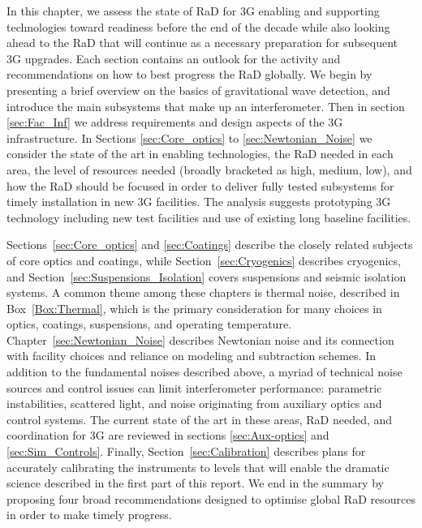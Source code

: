 
In this chapter, we assess the state of \ac{RaD} for \ac{3G} enabling and supporting technologies  toward readiness before the end of the decade while also looking ahead to the \ac{RaD} that will continue as a necessary preparation for subsequent \ac{3G} upgrades. Each section contains an outlook for the activity and recommendations on how to best  progress the \ac{RaD} globally.  We begin by presenting a brief overview on the basics of gravitational wave detection, and introduce the main subsystems that make up an interferometer. Then in section \ref{sec:Fac_Inf} we address requirements and design aspects of the \ac{3G} infrastructure. In Sections \ref{sec:Core_optics} to \ref{sec:Newtonian_Noise} we consider the state of the art in enabling technologies, the \ac{RaD} needed in each area, the level of resources needed (broadly bracketed as high, medium, low), and how the \ac{RaD} should be focused in order to deliver fully tested subsystems for timely installation in new \ac{3G} facilities.  The analysis suggests prototyping \ac{3G} technology including new test facilities and use of existing long baseline facilities. 



Sections~\ref{sec:Core_optics} and \ref{sec:Coatings} describe the closely related subjects of core optics and coatings, while Section~\ref{sec:Cryogenics} describes cryogenics, and Section~\ref{sec:Suspensions_Isolation} covers suspensions and seismic isolation systems.
A common theme among these chapters is thermal noise, described in Box~\ref{Box:Thermal}, which is the primary consideration for many choices in optics, coatings, suspensions, and operating temperature. 
Chapter~\ref{sec:Newtonian_Noise} describes Newtonian noise and its connection with facility choices and reliance on modeling and subtraction schemes. 
In addition to the fundamental noises described above, a myriad of technical noise sources and control issues can limit interferometer performance: parametric instabilities, scattered light, and noise originating from auxiliary optics and control systems. 
The current state of the art in these areas, \ac{RaD} needed, and coordination for \ac{3G} are reviewed in sections \ref{sec:Aux-optics} and \ref{sec:Sim_Controls}. 
Finally, Section~\ref{sec:Calibration} describes plans for accurately calibrating the instruments to levels that will enable the dramatic science described in the first part of this report.   We end in the summary  by proposing  four broad recommendations designed to optimise global \ac{RaD}  resources in order to make timely progress.


